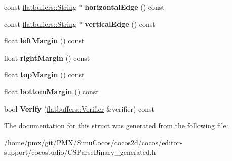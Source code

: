 \begin{DoxyCompactItemize}
\item 
\mbox{\label{structflatbuffers_1_1LayoutComponentTable_a10d1b3f27515fa1f8f2bc9bfe7f83786}} 
const \hyperlink{structflatbuffers_1_1String}{flatbuffers\+::\+String} $\ast$ {\bfseries horizontal\+Edge} () const
\item 
\mbox{\label{structflatbuffers_1_1LayoutComponentTable_af0d33c3cdaefac4624f020a0d099111e}} 
const \hyperlink{structflatbuffers_1_1String}{flatbuffers\+::\+String} $\ast$ {\bfseries vertical\+Edge} () const
\item 
\mbox{\label{structflatbuffers_1_1LayoutComponentTable_a824a6a6adbe0d9addfdeaea852bb08e1}} 
float {\bfseries left\+Margin} () const
\item 
\mbox{\label{structflatbuffers_1_1LayoutComponentTable_aac37d97844c977e7f9805016ffba62c2}} 
float {\bfseries right\+Margin} () const
\item 
\mbox{\label{structflatbuffers_1_1LayoutComponentTable_a4826aa41c6487ea2ca5410de886c8087}} 
float {\bfseries top\+Margin} () const
\item 
\mbox{\label{structflatbuffers_1_1LayoutComponentTable_abff9bc03e85b9b7ef7f71e892059bded}} 
float {\bfseries bottom\+Margin} () const
\item 
\mbox{\label{structflatbuffers_1_1LayoutComponentTable_afbd2d7146bbc768d38e4a82682bade75}} 
bool {\bfseries Verify} (\hyperlink{classflatbuffers_1_1Verifier}{flatbuffers\+::\+Verifier} \&verifier) const
\end{DoxyCompactItemize}


The documentation for this struct was generated from the following file\+:\begin{DoxyCompactItemize}
\item 
/home/pmx/git/\+P\+M\+X/\+Simu\+Cocos/cocos2d/cocos/editor-\/support/cocostudio/C\+S\+Parse\+Binary\+\_\+generated.\+h\end{DoxyCompactItemize}
